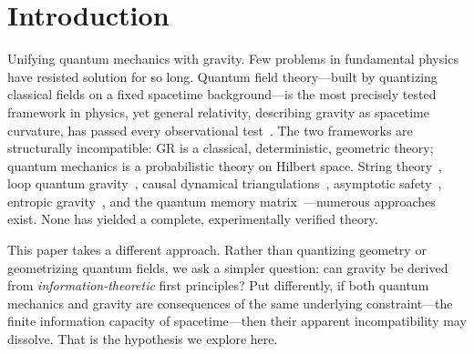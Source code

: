 \documentclass[aps,prd,twocolumn,showpacs,superscriptaddress,preprintnumbers]{revtex4-2}
\begin{document}
\maketitle

\section{Introduction}
\label{sec:intro}

Unifying quantum mechanics with gravity. Few problems in fundamental physics have resisted solution for so long.
Quantum field theory---built by quantizing classical fields on a fixed spacetime background---is the most precisely tested framework in physics, yet general relativity, describing gravity as spacetime curvature, has passed every observational test~\cite{Will:2014}.
The two frameworks are structurally incompatible: GR is a classical, deterministic, geometric theory; quantum mechanics is a probabilistic theory on Hilbert space.
String theory~\cite{Green:1987sp,Polchinski:1998rq}, loop quantum gravity~\cite{Rovelli:2004tv,Ashtekar:2004eh}, causal dynamical triangulations~\cite{Ambjorn:2001cv}, asymptotic safety~\cite{Weinberg:1979,Reuter:2012}, entropic gravity~\cite{Verlinde:2010hp,Jacobson:1995ab}, and the quantum memory matrix~\cite{Neukart:2024qmm}---numerous approaches exist.
None has yielded a complete, experimentally verified theory.

This paper takes a different approach. Rather than quantizing geometry or geometrizing quantum fields, we ask a simpler question: can gravity be derived from \emph{information-theoretic} first principles?
Put differently, if both quantum mechanics and gravity are consequences of the same underlying constraint---the finite information capacity of spacetime---then their apparent incompatibility may dissolve.
That is the hypothesis we explore here.
\end{document}
